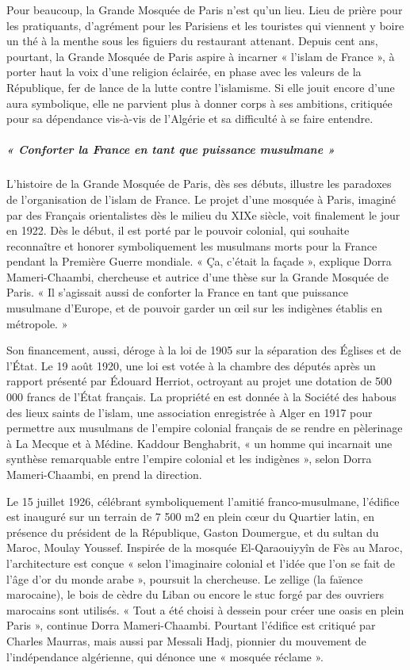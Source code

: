 Pour beaucoup, la Grande Mosquée de Paris n’est qu’un lieu. Lieu de prière pour les pratiquants, d’agrément pour les Parisiens et les touristes qui viennent y boire un thé à la menthe sous les figuiers du restaurant attenant. Depuis cent ans, pourtant, la Grande Mosquée de Paris aspire à incarner « l’islam de France », à porter haut la voix d’une religion éclairée, en phase avec les valeurs de la République, fer de lance de la lutte contre l’islamisme. Si elle jouit encore d’une aura symbolique, elle ne parvient plus à donner corps à ses ambitions, critiquée pour sa dépendance vis-à-vis de l’Algérie et sa difficulté à se faire entendre.

\subparagraph{« Conforter la France en tant que puissance musulmane »}

L’histoire de la Grande Mosquée de Paris, dès ses débuts, illustre les paradoxes de l’organisation de l’islam de France. Le projet d’une mosquée à Paris, imaginé par des Français orientalistes dès le milieu du XIXe siècle, voit finalement le jour en 1922. Dès le début, il est porté par le pouvoir colonial, qui souhaite reconnaître et honorer symboliquement les musulmans morts pour la France pendant la Première Guerre mondiale. « Ça, c’était la façade », explique Dorra Mameri-Chaambi, chercheuse et autrice d’une thèse sur la Grande Mosquée de Paris. « Il s’agissait aussi de conforter la France en tant que puissance musulmane d’Europe, et de pouvoir garder un œil sur les indigènes établis en métropole. »

Son financement, aussi, déroge à la loi de 1905 sur la séparation des Églises et de l’État. Le 19 août 1920, une loi est votée à la chambre des députés après un rapport présenté par Édouard Herriot, octroyant au projet une dotation de 500 000 francs de l’État français. La propriété en est donnée à la Société des habous des lieux saints de l’islam, une association enregistrée à Alger en 1917 pour permettre aux musulmans de l’empire colonial français de se rendre en pèlerinage à La Mecque et à Médine. Kaddour Benghabrit, « un homme qui incarnait une synthèse remarquable entre l’empire colonial et les indigènes », selon Dorra Mameri-Chaambi, en prend la direction.

 
Le 15 juillet 1926, célébrant symboliquement l’amitié franco-musulmane, l’édifice est inauguré sur un terrain de 7 500 m2 en plein cœur du Quartier latin, en présence du président de la République, Gaston Doumergue, et du sultan du Maroc, Moulay Youssef. Inspirée de la mosquée El-Qaraouiyyîn de Fès au Maroc, l’architecture est conçue « selon l’imaginaire colonial et l’idée que l’on se fait de l’âge d’or du monde arabe », poursuit la chercheuse. Le zellige (la faïence marocaine), le bois de cèdre du Liban ou encore le stuc forgé par des ouvriers marocains sont utilisés. « Tout a été choisi à dessein pour créer une oasis en plein Paris », continue Dorra Mameri-Chaambi. Pourtant l’édifice est critiqué par Charles Maurras, mais aussi par Messali Hadj, pionnier du mouvement de l’indépendance algérienne, qui dénonce une « mosquée réclame ».

